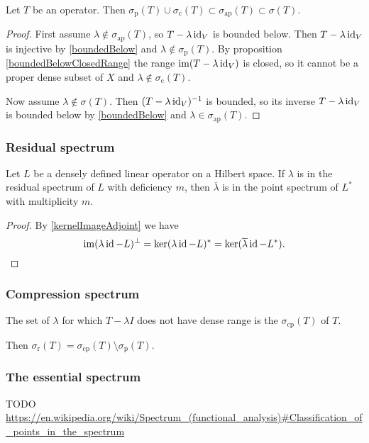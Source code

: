\begin{lemma}
Let $T$ be an operator. Then $\sigma_\text{p}(T)\cup\sigma_\text{c}(T)\subset\sigma_\text{ap}(T) \subset \sigma(T)$.
\end{lemma}
\begin{proof}
First assume $\lambda\notin \sigma_\text{ap}(T)$, 
so $T-\lambda \operatorname{id}_V$ is bounded below. Then $T-\lambda \operatorname{id}_V$ is injective by \ref{boundedBelow} and $\lambda\notin\sigma_\text{p}(T)$. By proposition \ref{boundedBelowClosedRange} the range $\operatorname{im}(T-\lambda \operatorname{id}_V)$ is closed, so it cannot be a proper dense subset of $X$ and $\lambda\notin\sigma_\text{c}(T)$.

Now assume $\lambda \notin \sigma(T)$. Then $(T-\lambda \operatorname{id}_V)^{-1}$ is bounded, so its inverse $T-\lambda \operatorname{id}_V$ is bounded below by \ref{boundedBelow} and $\lambda\in \sigma_\text{ap}(T)$.
\end{proof}

\subsubsection{Residual spectrum}
\begin{proposition}
Let $L$ be a densely defined linear operator on a Hilbert space. If $\lambda$ is in the residual spectrum of $L$ with deficiency $m$, then $\overline{\lambda}$ is in the point spectrum of $L^*$ with multiplicity $m$.
\end{proposition}
\begin{proof}
By \ref{kernelImageAdjoint} we have
\[ \operatorname{im}(\lambda \operatorname{id} - L)^\perp = \ker(\lambda\operatorname{id} - L)^* = \ker(\overline{\lambda}\operatorname{id} - L^*). \]
\end{proof}

\subsubsection{Compression spectrum}
\begin{definition}
The set of $\lambda$ for which $T-\lambda I$ does not have dense range is the  $\sigma_\text{cp}(T)$ of $T$.
\end{definition}
Then $\sigma_\text{r}(T) = \sigma_\text{cp}(T)\setminus\sigma_\text{p}(T)$.

\subsubsection{The essential spectrum}
TODO \url{https://en.wikipedia.org/wiki/Spectrum_(functional_analysis)#Classification_of_points_in_the_spectrum}



